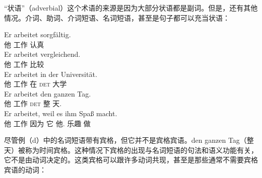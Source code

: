 “状语”（adverbial）这个术语的来源是因为大部分状语都是副词。但是，还有其他情况。介词、助词、介词短语、名词短语，甚至是句子都可以充当状语：

\eal
\ex 
\gll Er arbeitet sorgfältig.\\
	 他 工作 认真\\
\ex 
\gll Er arbeitet vergleichend.\\
	 他 工作 比较\\
\ex 
\gll Er arbeitet in der Universität.\\
	 他 工作 在 \textsc{det} 大学\\
\ex 
\gll Er arbeitet den ganzen Tag.\\
     他 工作 \textsc{det} 整 天.\acc\\
\ex 
\gll Er arbeitet, weil es ihm Spaß macht.\\
	 他 工作 因为 它 他.\dat{} 乐趣 做\\
\zl

\noindent
尽管例（d）中的名词短语带有宾格，但它并不是宾格宾语。den ganzen Tag（整天）被称为时间宾格。这种情况下宾格的出现与名词短语的句法和语义功能有关，它不是由动词决定的。这类宾格可以跟许多动词共现，甚至是那些通常不需要宾格宾语的动词：

